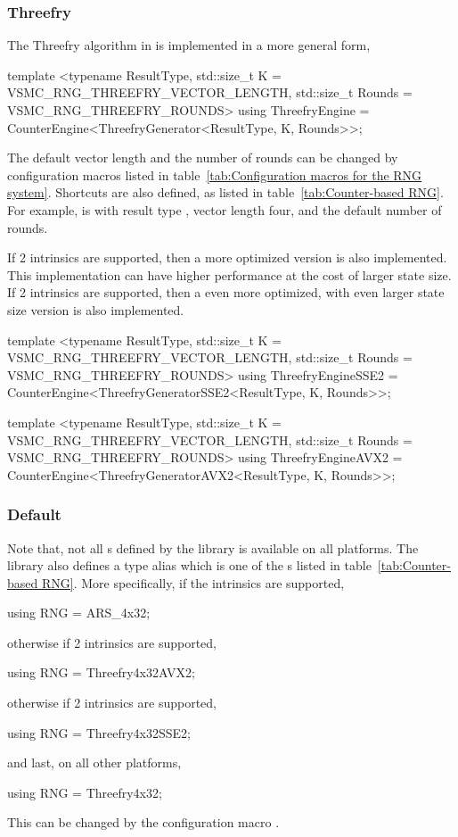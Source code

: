 \subsubsection{Threefry}
\label{ssub:Threefry}

The Threefry algorithm in \textcite{Salmon:2011um} is implemented in a more
general form,
\begin{cppcode}
  template <typename ResultType, std::size_t K = VSMC_RNG_THREEFRY_VECTOR_LENGTH,
  std::size_t Rounds = VSMC_RNG_THREEFRY_ROUNDS>
  using ThreefryEngine = CounterEngine<ThreefryGenerator<ResultType, K, Rounds>>;
\end{cppcode}
The default vector length and the number of rounds can be changed by
configuration macros listed in table~\ref{tab:Configuration macros for the RNG
  system}. Shortcuts are also defined, as listed in
table~\ref{tab:Counter-based RNG}. For example,  is
 with result type , vector
length four, and the default number of rounds.

If \sse{}2 intrinsics are supported, then a more optimized version is also
implemented. This implementation can have higher performance at the cost of
larger state size. If \avx{}2 intrinsics are supported, then a even more
optimized, with even larger state size version is also implemented.
\begin{cppcode}
  template <typename ResultType, std::size_t K = VSMC_RNG_THREEFRY_VECTOR_LENGTH,
  std::size_t Rounds = VSMC_RNG_THREEFRY_ROUNDS>
  using ThreefryEngineSSE2 =
  CounterEngine<ThreefryGeneratorSSE2<ResultType, K, Rounds>>;

  template <typename ResultType, std::size_t K = VSMC_RNG_THREEFRY_VECTOR_LENGTH,
  std::size_t Rounds = VSMC_RNG_THREEFRY_ROUNDS>
  using ThreefryEngineAVX2 =
  CounterEngine<ThreefryGeneratorAVX2<ResultType, K, Rounds>>;
\end{cppcode}

\subsubsection{Default \protect\rng}
\label{ssub:Default RNG}

Note that, not all \rng{}s defined by the library is available on all
platforms. The library also defines a type alias  which is one
of the \rng{}s listed in table~\ref{tab:Counter-based RNG}. More specifically,
if the \aesni intrinsics are supported,
\begin{cppcode}
  using RNG = ARS_4x32;
\end{cppcode}
otherwise if \avx{}2 intrinsics are supported,
\begin{cppcode}
  using RNG = Threefry4x32AVX2;
\end{cppcode}
otherwise if \sse{}2 intrinsics are supported,
\begin{cppcode}
  using RNG = Threefry4x32SSE2;
\end{cppcode}
and last, on all other platforms,
\begin{cppcode}
  using RNG = Threefry4x32;
\end{cppcode}
This can be changed by the configuration macro .

